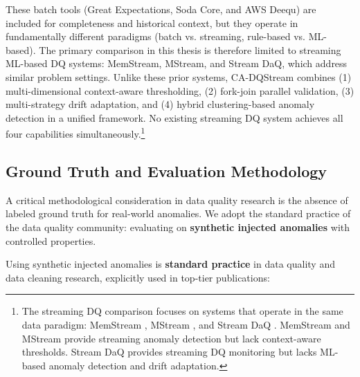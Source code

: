 These batch tools (Great Expectations, Soda Core, and AWS Deequ) are included for completeness and historical context, but they operate in fundamentally different paradigms (batch vs. streaming, rule-based vs. ML-based). The primary comparison in this thesis is therefore limited to streaming ML-based DQ systems: MemStream, MStream, and Stream DaQ, which address similar problem settings. Unlike these prior systems, CA-DQStream combines (1) multi-dimensional context-aware thresholding, (2) fork-join parallel validation, (3) multi-strategy drift adaptation, and (4) hybrid clustering-based anomaly detection in a unified framework. No existing streaming DQ system achieves all four capabilities simultaneously.\footnote{The streaming DQ comparison focuses on systems that operate in the same data paradigm: MemStream \citep{bhatia2022memstream}, MStream \citep{siddiqui2019mstream}, and Stream DaQ \citep{papastergios2025stream}. MemStream and MStream provide streaming anomaly detection but lack context-aware thresholds. Stream DaQ provides streaming DQ monitoring but lacks ML-based anomaly detection and drift adaptation.}

\subsection{Ground Truth and Evaluation Methodology}

A critical methodological consideration in data quality research is the absence of labeled ground truth for real-world anomalies. We adopt the standard practice of the data quality community: evaluating on \textbf{synthetic injected anomalies} with controlled properties.

Using synthetic injected anomalies is \textbf{standard practice} in data quality and data cleaning research, explicitly used in top-tier publications:

